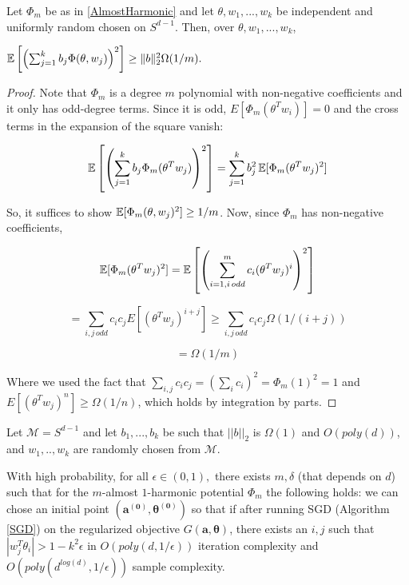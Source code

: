 \begin{lemma}\label{largeVariance}
 Let $\Phi_m$ be as in \ref{AlmostHarmonic} and let $\theta, w_1,...,w_k$ be independent and uniformly random  chosen on $S^{d-1}$. Then, over $\theta, w_1,...,w_k$,
 
 $\operatorname*{\mathbb{E}}\left[\left(  \sum_{j=1}^k b_j \Phi(\theta,w_j)\right)^2\right] \geq \|b\|_2^2 \Omega(1/m).$
\end{lemma}
%
\begin{proof}
Note that $\Phi_m$ is a degree $m$ polynomial with non-negative coefficients and it only has odd-degree terms. Since it is odd, $E[\Phi_m(\theta^Tw_i)] = 0$ and the cross terms in the expansion of the square vanish:

\[ \operatorname*{\mathbb{E}}\left[\left(  \sum_{j=1}^k b_j
     \Phi_m(\theta^Tw_j)\right)^2\right] = \sum_{j=1}^k b_j^2 \operatorname*{\mathbb{E}}[\Phi_m(\theta^Tw_j)^2]\]

So, it suffices to show $\operatorname*{\mathbb{E}}[\Phi_m(\theta,w_j)^2] \geq 1/m$.  Now, since $\Phi_m$ has non-negative coefficients,

\[\operatorname*{\mathbb{E}}[\Phi_m(\theta^Tw_j)^2] = \operatorname*{\mathbb{E}}\left[\left(\sum_{i=1, i \, odd}^m c_i (\theta^Tw_j)^i\right)^2\right]\]

\[ = \sum_{i,j \,odd} c_ic_j E[(\theta^Tw_j)^{i+j}] \geq \sum_{i,j \,odd}c_i c_j \Omega(1/(i+j)) \]

\[=\Omega(1/m) \]

Where we used the fact that $\sum_{i,j} c_ic_j = (\sum_i c_i)^2 = \Phi_m(1)^2 = 1$ and $E[(\theta^Tw_j)^{n}] \geq \Omega(1/n)$, which holds by integration by parts.
\end{proof}

\begin{theorem}
  Let $\mathcal{M} = S^{d-1}$ and let $b_1,...,b_k$ be such that
  $||b||_2$ is $\Omega(1)$ and $O(poly(d))$, and $w_1,..,w_k$ are
  randomly chosen from $\mathcal{M}$. 
  
  With high probability, for all $\epsilon \in (0,1),$ there exists $m, \delta$ (that depends on $d$) such that for the $m$-almost $1$-harmonic potential $\Phi_m$ the
  following holds: we can chose an initial point $(\boldsymbol{a^{(0)}, \theta^{(0)}})$ so that if after running SGD (Algorithm \ref{SGD}) on the regularized objective
  $G(\boldsymbol{a,\theta})$, there exists an $i, j$ such that $|w_j^T\theta_i| > 1- k^2\epsilon$ in $O(poly(d,1/\epsilon))$ iteration complexity and $O(poly(d^{log(d)},1/\epsilon))$ sample complexity.
\end{theorem}

